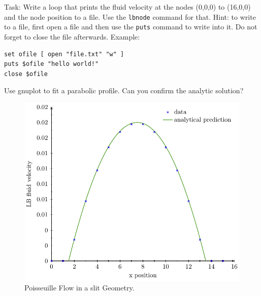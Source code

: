 Task: Write a loop that prints the fluid velocity at the nodes (0,0,0) to (16,0,0)
and the node position to a file. Use the \lstinline|lbnode| command for that. Hint: to write 
to a file, first open a file and then use the \lstinline|puts| command to write 
into it. Do not forget to close the file afterwards. Example:
\vspace{ 0,2cm}
\begin{lstlisting}[numbers=none]
set ofile [ open "file.txt" "w" ]
puts $ofile "hello world!"
close $ofile
\end{lstlisting}
\vspace{ 0,2cm}
Use gnuplot to fit a parabolic profile. Can you confirm the analytic solution?
\begin{figure}[h]
  \begin{center}
    \includegraphics{figures/poiseuille/poiseuille.pdf}
  \end{center}
  \caption{Poisseuille Flow in a slit Geometry.}
\end{figure}

